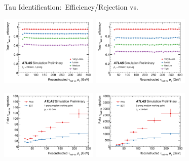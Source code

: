 \documentclass[11pt, xcolor={dvipsnames}, aspectratio=169, notes]{beamer}
\begin{document}
\begin{frame}{Tau Identification:\ Efficiency/Rejection vs.\ \allbold{\pT}}
  \centering

  \includegraphics[width=0.35\textwidth]{tauid/pubnote/eff_vs_pt_1p}%
  \includegraphics[width=0.35\textwidth]{tauid/pubnote/eff_vs_pt_3p}%

  \includegraphics[width=0.35\textwidth]{tauid/pubnote/rej_vs_pt_1p}%
  \includegraphics[width=0.35\textwidth]{tauid/pubnote/rej_vs_pt_3p}%
\end{frame}

\end{document}
